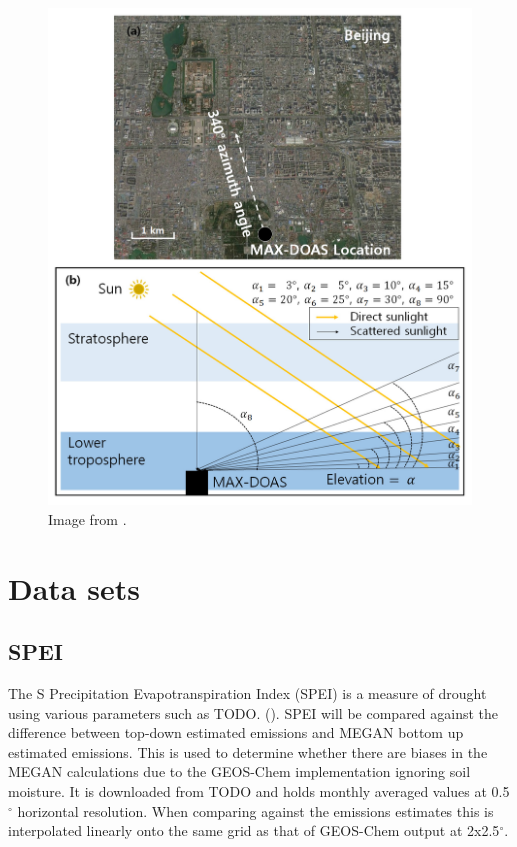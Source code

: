     \begin{figure}
      \includegraphics[width=\textwidth]{Figures/MAXDoasExample.png}
      \caption{ Image from \textcite{Lee2015}.}
      \label{LR:HCHO:fig_MAXDOASExample}
    \end{figure}

\section{Data sets}
  \subsection{SPEI}
  
    The S Precipitation Evapotranspiration Index (SPEI) is a measure of drought using various parameters such as TODO. (\textcite{Wang2017}).
    SPEI will be compared against the difference between top-down estimated emissions and MEGAN bottom up estimated emissions. 
    This is used to determine whether there are biases in the MEGAN calculations due to the GEOS-Chem implementation ignoring soil moisture.
    It is downloaded from TODO and holds monthly averaged values at 0.5$^{\circ}$ horizontal resolution.
    When comparing against the emissions estimates this is interpolated linearly onto the same grid as that of GEOS-Chem output at 2x2.5$^{\circ}$.
    
